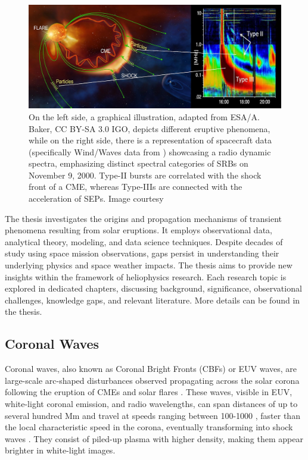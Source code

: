 \begin{figure}[!htp]
	\centerline{\includegraphics[width=0.9\columnwidth]{chapter1/figs/srbs.jpeg}}
	\caption{On the left side, a graphical illustration, adapted from ESA/A. Baker, CC BY-SA 3.0 IGO, depicts different eruptive phenomena, while on the right side, there is a representation of spacecraft data (specifically Wind/Waves data from \citet{gopalswamy_2019}) showcasing a radio dynamic spectra, emphasizing distinct spectral categories of SRBs on November 9, 2000. Type-II bursts are correlated with the shock front of a CME, whereas Type-IIIs are connected with the acceleration of SEPs. Image courtesy\protect\footnotemark}
	\label{fig_sw}
\end{figure}

The thesis investigates the origins and propagation mechanisms of transient phenomena resulting from solar eruptions. It employs observational data, analytical theory, modeling, and data science techniques. Despite decades of study using space mission observations, gaps persist in understanding their underlying physics and space weather impacts. The thesis aims to provide new insights within the framework of heliophysics research. Each research topic is explored in dedicated chapters, discussing background, significance, observational challenges, knowledge gaps, and relevant literature. More details can be found in the thesis. 


\subsection{Coronal Waves}
Coronal waves, also known as Coronal Bright Fronts (CBFs) or EUV waves, are large-scale arc-shaped disturbances observed propagating across the solar corona following the eruption of CMEs and solar flares \citep{thompson_1998, nindos_2008, vrsnak_2008, magdalenic_2010, veronig_2010, warmuth_2015}. These waves, visible in EUV, white-light coronal emission, and radio wavelengths, can span distances of up to several hundred Mm and travel at speeds ranging between 100-1000 \kms, faster than the local characteristic speed in the corona, eventually transforming into shock waves \citep{pick_2006, thompson_2009, nitta_2013, liu_2014}. They consist of piled-up plasma with higher density, making them appear brighter in white-light images.

